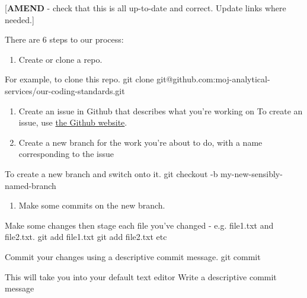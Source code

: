 \documentclass[]{book}
\newenvironment{Shaded}{\begin{snugshade}}{\end{snugshade}}
\newcommand{\ExtensionTok}[1]{#1}
\newcommand{\FunctionTok}[1]{\textcolor[rgb]{0.00,0.00,0.00}{#1}}
\newcommand{\NormalTok}[1]{#1}
\newcommand{\StringTok}[1]{\textcolor[rgb]{0.31,0.60,0.02}{#1}}
\providecommand{\tightlist}{%
  \setlength{\itemsep}{0pt}\setlength{\parskip}{0pt}}
\begin{document}
{[}\textbf{AMEND} - check that this is all up-to-date and correct. Update links where needed.{]}

There are 6 steps to our process:

\begin{enumerate}
\def\labelenumi{\arabic{enumi}.}
\tightlist
\item
  Create or clone a repo.
\end{enumerate}

\begin{Shaded}
\begin{Highlighting}[]
\ExtensionTok{For}\NormalTok{ example, to clone this repo.}
\FunctionTok{git}\NormalTok{ clone git@github.com:moj-analytical-services/our-coding-standards.git}
\end{Highlighting}
\end{Shaded}

\begin{enumerate}
\def\labelenumi{\arabic{enumi}.}
\setcounter{enumi}{1}
\item
  Create an issue in Github that describes what you're working on
  To create an issue, use \href{https://guides.github.com/features/issues/}{the Github website}.
\item
  Create a new branch for the work you're about to do, with a name corresponding to the issue
\end{enumerate}

\begin{Shaded}
\begin{Highlighting}[]
\ExtensionTok{To}\NormalTok{ create a new branch and switch onto it.}
\FunctionTok{git}\NormalTok{ checkout -b my-new-sensibly-named-branch}
\end{Highlighting}
\end{Shaded}

\begin{enumerate}
\def\labelenumi{\arabic{enumi}.}
\setcounter{enumi}{3}
\tightlist
\item
  Make some commits on the new branch.
\end{enumerate}

\begin{Shaded}
\begin{Highlighting}[]
\ExtensionTok{Make}\NormalTok{ some changes then stage each file you}\StringTok{'ve changed - e.g. file1.txt and file2.txt.}
\StringTok{git add file1.txt}
\StringTok{git add file2.txt}
\StringTok{etc}

\StringTok{Commit your changes using a descriptive commit message.}
\StringTok{git commit}

\StringTok{This will take you into your default text editor}
\StringTok{Write a descriptive commit message}
\end{Highlighting}
\end{Shaded}
\end{document}

